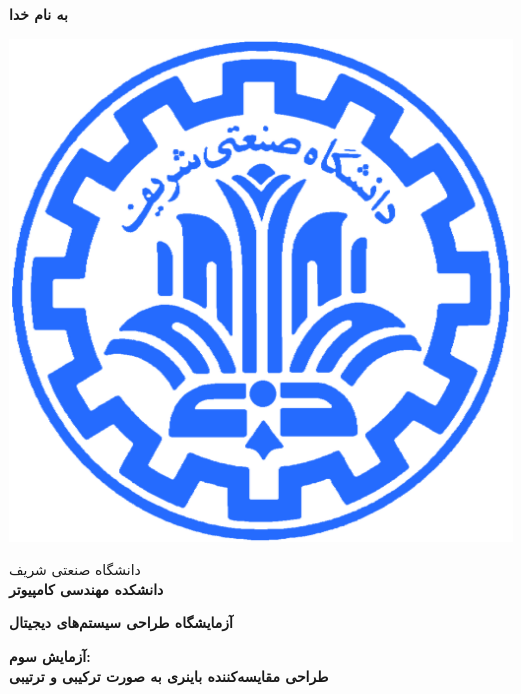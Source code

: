 \documentclass[12pt,onecolumn,a4paper,fleqn]{article}
\begin{document}
	\large
	\begin{titlepage}
		
		\begin{center}
			\begin{huge}
				\textbf{
					به نام خدا\\
				}
			\end{huge}
			
			\vspace*{1.5cm}
			\includegraphics[scale=0.9]{source/sharif_logo.png}\\
			\vspace*{0.5cm}
			\begin{Large}
				
				دانشگاه صنعتی شریف\\
				\vspace*{0.25cm}
				\textbf{
					دانشکده مهندسی کامپیوتر\\
				}
			\end{Large}
			\vspace*{3cm}
			\begin{huge}
				\textbf{
					آزمایشگاه طراحی سیستم‌های دیجیتال\\
					\vspace*{1.75cm}
				}
			\end{huge}
			
			\begin{Large}
				\textbf{
					آزمایش سوم:\\
					طراحی مقایسه‌کننده باینری به صورت ترکیبی و ترتیبی\\
				}
			\end{Large}
			

\end{center}
\end{titlepage}
\end{document}
